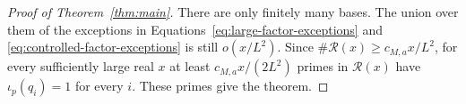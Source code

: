 \begin{proof}[Proof of Theorem~\ref{thm:main}]
There are only finitely many bases.  The union over them of the exceptions
in Equations~\eqref{eq:large-factor-exceptions} and
\eqref{eq:controlled-factor-exceptions} is still \(o(x/L^2)\).  Since
\(\#\mathcal R(x)\ge c_{M,a}x/L^2\), for every sufficiently large real
\(x\) at least \(c_{M,a}x/(2L^2)\) primes in \(\mathcal R(x)\) have
\(\iota_p(q_i)=1\) for every \(i\).  These primes give the theorem.
\end{proof}
